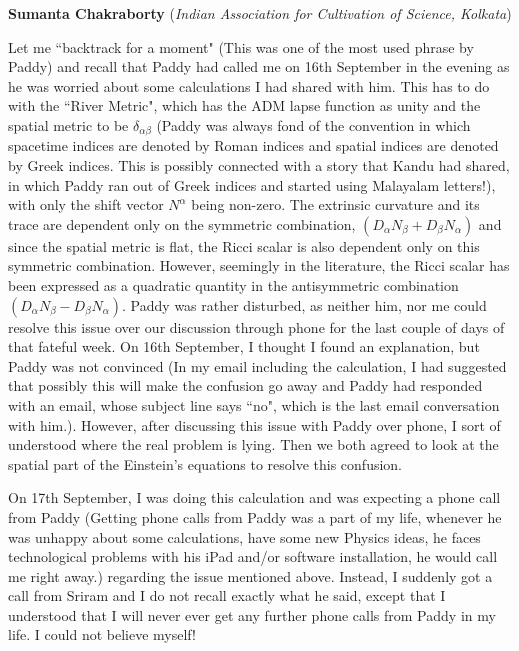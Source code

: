 \documentclass[prd, preprint, longbibliography, 12pt]{revtex4-2}
\begin{document}
\centerline{{\bf Sumanta Chakraborty} ({\it Indian Association for Cultivation of Science, Kolkata})}
\medskip
\noindent Let me ``backtrack for a moment" (This was one of the most used phrase by Paddy) and recall that Paddy had called me on 16th September in the evening as he was worried about some calculations I had shared with him. This has to do with the ``River Metric", which has the ADM lapse function as unity and the spatial metric to be $\delta_{\alpha \beta}$ (Paddy was always fond of the convention in which spacetime indices are denoted by Roman indices and spatial indices are denoted by Greek indices. This is possibly connected with a story that Kandu had shared, in which Paddy ran out of Greek indices and started using Malayalam letters!), with only the shift vector $N^{\alpha}$ being non-zero. The extrinsic curvature and its trace are dependent only on the symmetric combination, $(D_{\alpha}N_{\beta}+D_{\beta}N_{\alpha})$ and since the spatial metric is flat, the Ricci scalar is also dependent only on this symmetric combination. However, seemingly in the literature, the Ricci scalar has been expressed as a quadratic quantity in the antisymmetric combination $(D_{\alpha}N_{\beta}-D_{\beta}N_{\alpha})$. Paddy was rather disturbed, as neither him, nor me could resolve this issue over our discussion through phone for the last couple of days of that fateful week. On 16th September, I thought I found an explanation, but Paddy was not convinced (In my email including the calculation, I had suggested that possibly this will make the confusion go away and Paddy had responded with an email, whose subject line says ``no", which is the last email conversation with him.). However, after discussing this issue with Paddy over phone, I sort of understood where the real problem is lying. Then we both agreed to look at the spatial part of the Einstein's equations to resolve this confusion. 

On 17th September, I was doing this calculation and was expecting a phone call from Paddy (Getting phone calls from Paddy was a part of my life, whenever he was unhappy about some calculations, have some new Physics ideas, he faces technological problems with his iPad and/or software installation, he would call me right away.) regarding the issue mentioned above. Instead, I suddenly got a call from Sriram and I do not recall exactly what he said, except that I understood that I will never ever get any further phone calls from Paddy in my life. I could not believe myself!
\end{document}
